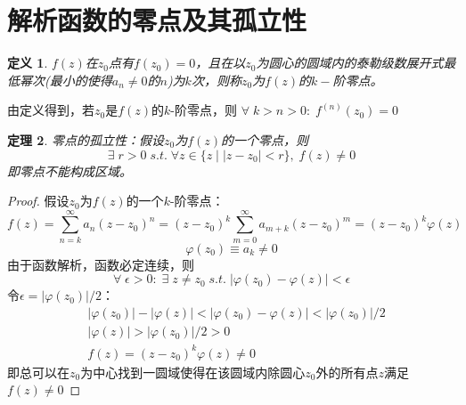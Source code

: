 \documentclass[10pt, a4paper, oneside]{ctexbook}
\newtheorem{theorem}{定理}[section]
\newtheorem{definition}[theorem]{定义}
\newcommand{\F}[1][z]
{\ensuremath{f(#1)}}
\begin{document}
\section{解析函数的零点及其孤立性}
\begin{definition}
    $\F$在$z_0$点有$f(z_0)=0$，且在以$z_0$为圆心的圆域内的泰勒级数展开式最低幂次(最小的使得$a_n\ne0$的$n$)为$k$次，则称$z_0$为$\F$的$k-$阶零点。
\end{definition}
由定义得到，若$z_0$是$\F$的$k$-阶零点，则
$\forall\;k>n>0: \; f^{(n)}(z_0)=0$
\begin{theorem}
    零点的孤立性：假设$z_0$为$\F$的一个零点，则
    $$
        \exists\; r > 0 \; s.t. \; \forall z \in \{z \mid |z-z_0|<r\},\; f(z) \ne 0
    $$
    即零点不能构成区域。
\end{theorem}
\begin{proof}
    假设$z_0$为$\F$的一个$k$-阶零点：
    $$f(z)=\sum_{n=k}^\infty a_n(z-z_0)^n=(z-z_0)^k\sum_{m=0}^\infty a_{m+k}(z-z_0)^m=(z-z_0)^k\varphi (z) $$
    $$\varphi (z_0)\equiv a_k \ne 0$$
    由于函数解析，函数必定连续，则
    $$\forall\; \epsilon>0:\; \exists \;z\ne z_0 \;s.t.\; |\varphi (z_0) - \varphi (z)|< \epsilon$$
    令$\epsilon=|\varphi (z_0)|/2$：
    \begin{align*}
         & |\varphi (z_0)| - |\varphi (z)|<|\varphi (z_0) - \varphi (z)|< |\varphi (z_0)|/2 \\
         & |\varphi (z)| > |\varphi (z_0)|/2 > 0                                            \\
         & \F=(z-z_0)^k\varphi (z)\ne0
    \end{align*}
    即总可以在$z_0$为中心找到一圆域使得在该圆域内除圆心$z_0$外的所有点$z$满足$f(z)\ne0$
\end{proof}
\end{document}
